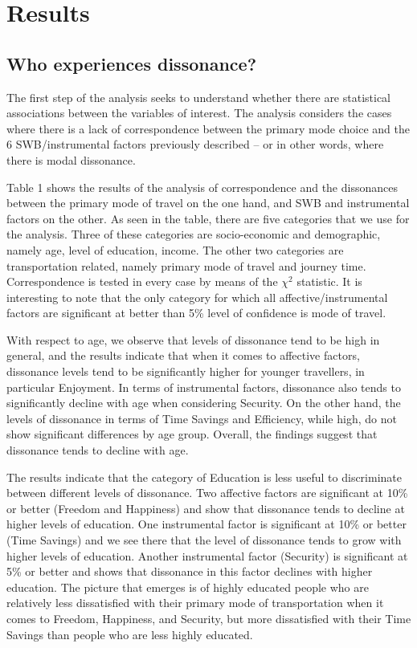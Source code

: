 \documentclass[]{elsarticle} %
\begin{document}
\hypertarget{results}{%
\section{Results}\label{results}}

\hypertarget{who-experiences-dissonance}{%
\subsection{Who experiences
dissonance?}\label{who-experiences-dissonance}}

The first step of the analysis seeks to understand whether there are
statistical associations between the variables of interest. The analysis
considers the cases where there is a lack of correspondence between the
primary mode choice and the 6 SWB/instrumental factors previously
described -- or in other words, where there is modal dissonance.

Table 1 shows the results of the analysis of correspondence and the
dissonances between the primary mode of travel on the one hand, and SWB
and instrumental factors on the other. As seen in the table, there are
five categories that we use for the analysis. Three of these categories
are socio-economic and demographic, namely age, level of education,
income. The other two categories are transportation related, namely
primary mode of travel and journey time. Correspondence is tested in
every case by means of the \(\chi^2\) statistic. It is interesting to
note that the only category for which all affective/instrumental factors
are significant at better than 5\% level of confidence is mode of
travel.

With respect to age, we observe that levels of dissonance tend to be
high in general, and the results indicate that when it comes to
affective factors, dissonance levels tend to be significantly higher for
younger travellers, in particular Enjoyment. In terms of instrumental
factors, dissonance also tends to significantly decline with age when
considering Security. On the other hand, the levels of dissonance in
terms of Time Savings and Efficiency, while high, do not show
significant differences by age group. Overall, the findings suggest that
dissonance tends to decline with age.

The results indicate that the category of Education is less useful to
discriminate between different levels of dissonance. Two affective
factors are significant at 10\% or better (Freedom and Happiness) and
show that dissonance tends to decline at higher levels of education. One
instrumental factor is significant at 10\% or better (Time Savings) and
we see there that the level of dissonance tends to grow with higher
levels of education. Another instrumental factor (Security) is
significant at 5\% or better and shows that dissonance in this factor
declines with higher education. The picture that emerges is of highly
educated people who are relatively less dissatisfied with their primary
mode of transportation when it comes to Freedom, Happiness, and
Security, but more dissatisfied with their Time Savings than people who
are less highly educated.
\end{document}
